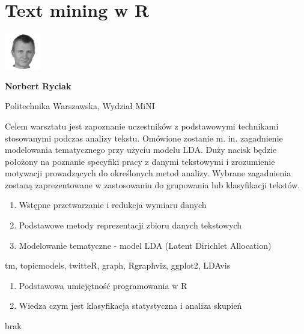 \documentclass[\main/boa.tex]{subfiles}
\begin{document}
\section{Text mining w R}
\begin{minipage}[t]{0.915\textwidth}
	\center     
    \includegraphics[width=60px]{img/workshops/czarno_biale/ryciak-crop.png} 
\end{minipage}

\begin{minipage}{0.915\textwidth}
\centering
{\bf {} Norbert Ryciak}
\end{minipage}

\vskip 0.3cm

\begin{affiliations}
\begin{minipage}{0.915\textwidth}
\centering
\large Politechnika Warszawska, Wydział MiNI  \\[2pt]
\end{minipage}
\end{affiliations}

\vskip 0.8cm

\opiswarsztatu Celem warsztatu jest zapoznanie uczestników z podstawowymi technikami stosowanymi podczas analizy tekstu. Omówione zostanie m. in. zagadnienie modelowania tematycznego przy użyciu modelu LDA. Duży nacisk będzie położony na poznanie specyfiki pracy z danymi tekstowymi i zrozumienie motywacji prowadzących do określonych metod analizy. Wybrane zagadnienia zostaną zaprezentowane w zastosowaniu do grupowania lub klasyfikacji tekstów.

\planwarsztatu
\begin{enumerate}
\item Wstępne przetwarzanie i redukcja wymiaru danych
\item Podstawowe metody reprezentacji zbioru danych tekstowych
\item Modelowanie tematyczne - model LDA (Latent Dirichlet Allocation)
\end{enumerate}	 

\pakiety tm, topicmodels, twitteR, graph, Rgraphviz, ggplot2, LDAvis

\umiejetnosci\begin{enumerate}
	\item Podstawowa umiejętność programowania w R
	\item Wiedza czym jest klasyfikacja statystyczna i analiza skupień
\end{enumerate}

\wymagania brak
\end{document}
